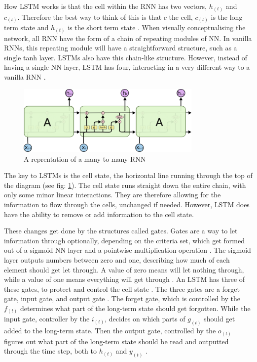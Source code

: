 \documentclass[a4paper,10pt]{article}
\begin{document}
	How LSTM works is that the cell within the RNN has two vectors, $h_{(t)}$ and $c_{(t)}$. Therefore the best way to think of this is that $c$ the cell, $c_{(t)}$ is the long term state and $h_{(t)}$ is the short term state \cite{geron2019hands}. When visually conceptualising the network, all RNN have the form of a chain of repeating modules of NN. In vanilla RNNs, this repeating module will have a straightforward structure, such as a single tanh layer. LSTMs also have this chain-like structure. However, instead of having a single NN layer, LSTM has four, interacting in a very different way to a vanilla RNN \cite{lstm_networks}. 
	
	\begin{figure}
		\begin{center}
			\includegraphics[width=9cm]{LSTM3-chain.png}
			\caption{A reprentation of a many to many RNN \cite{lstm_networks}}
			\label{fig:LSTM_diagram}
		\end{center}
	\end{figure} 
	
	The key to LSTMs is the cell state, the horizontal line running through the top of the diagram (see fig: \ref{fig:LSTM_diagram}). The cell state runs straight down the entire chain, with only some minor linear interactions. They are therefore allowing for the information to flow through the cells, unchanged if needed. However, LSTM does have the ability to remove or add information to the cell state. 
	
	These changes get done by the structures called gates. Gates are a way to let information through optionally, depending on the criteria set, which get formed out of a sigmoid NN layer and a pointwise multiplication operation \cite{lstm_networks}. The sigmoid layer outputs numbers between zero and one, describing how much of each element should get let through. A value of zero means will let nothing through, while a value of one means everything will get through \cite{lstm_networks, geron2019hands}. An LSTM has three of these gates, to protect and control the cell state \cite{lstm_networks}. The three gates are a forget gate, input gate, and output gate \cite{illustrated_lstm_gru, geron2019hands}. The forget gate, which is controlled by the $f_{(t)}$ determines what part of the long-term state should get forgotten. While the input gate, controller by the $i_{(t)}$, decides on which parts of $g_{(t)}$ should get added to the long-term state. Then the output gate, controlled by the $o_{(t)}$ figures out what part of the long-term state should be read and outputted through the time step, both to $h_{(t)}$ and $y_{(t)}$ \cite{geron2019hands}.
	
\end{document}
